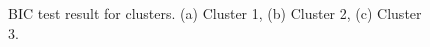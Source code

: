 \begin{figure}[ht!]
  \centering
  \caption{  {BIC test result for clusters. (a) Cluster 1, (b) Cluster 2, (c) Cluster 3.}
}

\label{fig:bic}
\end{figure}



